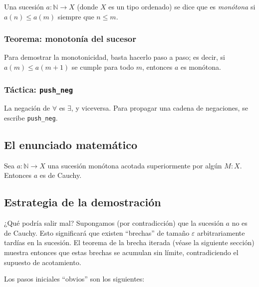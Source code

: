 Una sucesión $a : \mathbb{N} \to X$ (donde $X$ es un tipo ordenado) se
dice que es \emph{monótona} si $a(n) \leq a(m)$ siempre que $n \leq m$.

\subsubsection{Teorema: monotonía del sucesor}

Para demostrar la monotonicidad, basta hacerlo paso a paso; es decir, si
$a(m) \leq a(m+1)$ se cumple para todo $m$, entonces $a$ es monótona.

\subsubsection{Táctica: \texttt{push\_neg}}

La negación de $\forall$ es $\exists$, y viceversa. Para propagar una
cadena de negaciones, se escribe \texttt{push\_neg}.

\subsection{El enunciado matemático}

\begin{theorem}
Sea $a : \mathbb{N} \to X$ una sucesión monótona acotada superiormente por
algún $M : X$. Entonces $a$ es de Cauchy.
\end{theorem}

\subsection{Estrategia de la demostración}

¿Qué podría salir mal? Supongamos (por contradicción) que la sucesión $a$
no es de Cauchy. Esto significará que existen ``brechas'' de tamaño
$\varepsilon$ arbitrariamente tardías en la sucesión. El teorema de la
brecha iterada (véase la siguiente sección) muestra entonces que estas
brechas se acumulan sin límite, contradiciendo el supuesto de acotamiento.

Los pasos iniciales ``obvios'' son los siguientes:


